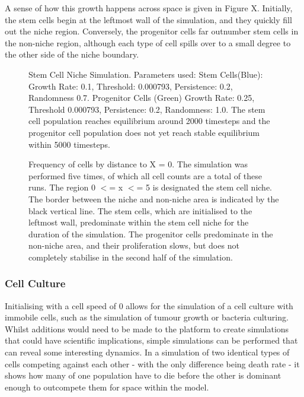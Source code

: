 \documentclass[11.5pt]{article}
\begin{document}
A sense of how this growth happens across space is given in Figure X. 
Initially, the stem cells begin at the leftmost wall of the simulation, 
and they quickly fill out the niche region. Conversely, the progenitor 
cells far outnumber stem cells in the non-niche region, although each 
type of cell spills over to a small degree to the other side of the 
niche boundary.

\begin{figure}[H]
\centering
\caption{Stem Cell Niche Simulation. 
Parameters used: Stem Cells(Blue): Growth Rate: 0.1, Threshold: 
0.000793, Persistence: 0.2, Randomness 0.7. Progenitor Cells (Green) 
Growth Rate: 0.25, Threshold 0.000793, Persistence: 0.2, Randomness: 
1.0. The stem cell population reaches equilibrium around 2000 timesteps 
and the progenitor cell population does not yet reach stable equilibrium 
within 5000 timesteps.}
\end{figure}

\begin{figure}[H]
\centering

\caption{Frequency of cells by distance 
to X = 0. The simulation was performed five times, of which all cell 
counts are a total of these runs. The region 0 $<$= x $<$= 5 is 
designated the stem cell niche. The border between the niche and 
non-niche area is indicated by the black vertical line. The stem cells, 
which are initialised to the leftmost wall, predominate within the stem 
cell niche for the duration of the simulation. The progenitor cells 
predominate in the non-niche area, and their proliferation slows, but 
does not completely stabilise in the second half of the simulation.}
\end{figure}

\subsubsection{Cell Culture}
Initialising with a cell speed of 0 allows for the simulation of a cell 
culture with immobile cells, such as the simulation of tumour growth or 
bacteria culturing. Whilst additions would need to be made to the 
platform to create simulations that could have scientific implications, 
simple simulations can be performed that can reveal some interesting 
dynamics. In a simulation of two identical types of cells competing 
against each other - with the only difference being death rate - it 
shows how many of one population have to die before the other is 
dominant enough to outcompete them for space within the model.
\end{document}
